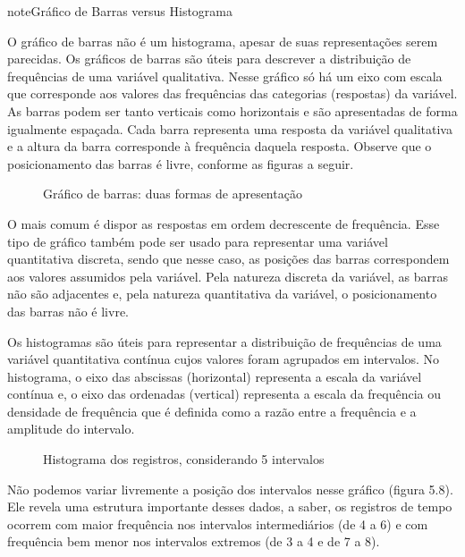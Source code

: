 \begin{sphinxadmonition}{note}{Gráfico de Barras versus Histograma}

O gráfico de barras não é um histograma, apesar de suas representações serem parecidas.  Os gráficos de barras são úteis para descrever a distribuição de frequências de uma variável qualitativa. Nesse gráfico só há um eixo com escala que corresponde aos valores das frequências das categorias (respostas) da variável. As barras podem ser tanto verticais como horizontais e são apresentadas de forma igualmente espaçada. Cada barra representa uma resposta da variável qualitativa e a altura da barra corresponde à frequência daquela resposta. Observe que o posicionamento das barras é livre, conforme as figuras a seguir.

\begin{figure}[H]
\centering
\capstart

\noindent{}
\caption{Gráfico de barras: duas formas de apresentação}\label{\detokenize{PE103-4:id2}}\label{\detokenize{PE103-4:id10}}\end{figure}

O mais comum é dispor as respostas em ordem decrescente de frequência. Esse tipo de gráfico também pode ser usado para representar uma variável quantitativa discreta, sendo que nesse caso, as posições das barras correspondem aos valores assumidos pela variável. Pela natureza discreta da variável, as barras não são adjacentes e, pela natureza quantitativa da variável, o posicionamento das barras não é livre.

Os histogramas são úteis para representar a distribuição de frequências de uma variável quantitativa contínua cujos valores foram agrupados em intervalos. No histograma, o eixo das abscissas (horizontal) representa a escala da variável contínua e, o eixo das ordenadas (vertical) representa a escala da frequência ou densidade de frequência que é definida como a razão entre a frequência e a amplitude do intervalo.

\begin{figure}[H]
\centering
\capstart

\noindent{}
\caption{Histograma dos registros, considerando 5 intervalos}\label{\detokenize{PE103-4:id3}}\label{\detokenize{PE103-4:id11}}\end{figure}

Não podemos variar livremente a posição dos intervalos nesse gráfico (figura 5.8). Ele revela uma estrutura importante desses dados, a saber, os registros de tempo ocorrem com maior frequência nos intervalos intermediários (de 4 a 6) e com frequência bem menor nos intervalos extremos (de 3 a 4 e de 7 a 8).
\end{sphinxadmonition}


